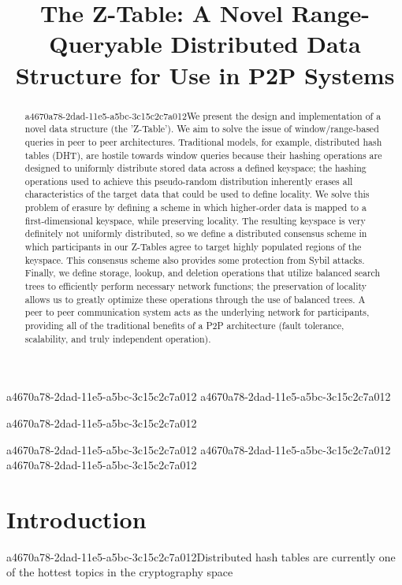 \documentclass[12pt]{article}
\title{The Z-Table: A Novel Range-Queryable Distributed Data Structure for Use in P2P Systems}
\begin{document}
a4670a78-2dad-11e5-a5bc-3c15c2c7a012
a4670a78-2dad-11e5-a5bc-3c15c2c7a012\maketitle

a4670a78-2dad-11e5-a5bc-3c15c2c7a012\begin{abstract}
a4670a78-2dad-11e5-a5bc-3c15c2c7a012We present the design and implementation of a novel data structure (the 'Z-Table'). We aim to solve the issue of window/range-based queries in peer to peer architectures. Traditional models, for example,  distributed hash tables (DHT), are hostile towards window queries because their hashing operations are designed to uniformly distribute stored data across a defined keyspace; the hashing operations used to achieve this pseudo-random distribution inherently erases all characteristics of the target data that could be used to define locality. We solve this problem of erasure by defining a scheme in which higher-order data is mapped to a first-dimensional keyspace, while preserving locality. The resulting keyspace is very definitely not uniformly distributed, so we define a distributed consensus scheme in which participants in our Z-Tables agree to target highly populated regions of the keyspace. This consensus scheme also provides some protection from Sybil attacks. Finally, we define storage, lookup, and deletion operations that utilize balanced search trees to efficiently perform necessary network functions; the preservation of locality allows us to greatly optimize these operations through the use of balanced trees. A peer to peer communication system acts as the underlying network for participants, providing all of the traditional benefits of a P2P architecture (fault tolerance, scalability, and truly independent operation).
\end{abstract}

a4670a78-2dad-11e5-a5bc-3c15c2c7a012
a4670a78-2dad-11e5-a5bc-3c15c2c7a012\newpage
a4670a78-2dad-11e5-a5bc-3c15c2c7a012\section{Introduction}
a4670a78-2dad-11e5-a5bc-3c15c2c7a012Distributed hash tables are currently one of the hottest topics in the cryptography space~\cite{Stoica:2001dj,Rowstron:2001ea,Ratnasamy:2001wn}

\printbibliography
\end{document}
